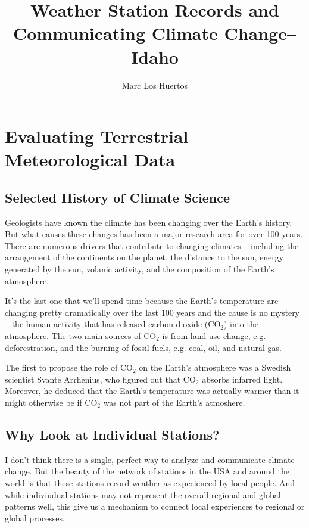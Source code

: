 \documentclass{article}\usepackage[]{graphicx}\usepackage[]{color}
\title{Weather Station Records and Communicating Climate Change--Idaho}
\author{Marc Los Huertos}
\begin{document}
\maketitle

\tableofcontents

\section{Evaluating Terrestrial Meteorological Data}

\subsection{Selected History of Climate Science}

Geologists have known the climate has been changing over the Earth's history. But what causes these changes has been a major research area for over 100 years. There are numerous drivers that contribute to changing climates -- including the arrangement of the continents on the planet, the distance to the sun, energy generated by the sun, volanic activity, and the composition of the Earth's atmosphere. 

It's the last one that we'll spend time because the Earth's temperature are changing pretty dramatically over the last 100 years and the cause is no mystery -- the human activity that has released carbon dioxide (CO$_2$) into the atmosphere. The two main sources of CO$_2$ is from land use change, e.g. deforestration, and the burning of fossil fuels, e.g. coal, oil, and natural gas. 

The first to propose the role of CO$_2$ on the Earth's atmosphere was a Swedish scientist Svante Arrhenius, who figured out that CO$_2$ absorbs infarred light. Moreover, he deduced that the Earth's temperature was actually warmer than it might otherwise be if CO$_2$ was not part of the Earth's atmoshere. 

\subsection{Why Look at Individual Stations?}

I don't think there is a single, perfect way to analyze and communicate climate change. But the beauty of the network of stations in the USA and around the world is that these stations record weather as expecienced by local people. And while indiviudual stations may not represent the overall regional and global patterns well, this give us a mechanism to connect local experiences to regional or global processes. 
\end{document}
